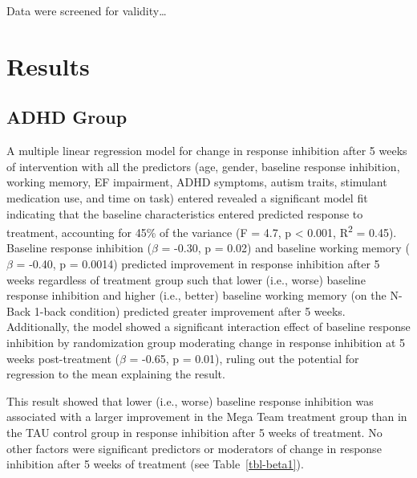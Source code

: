 \documentclass[
  letterpaper,
]{ut-thesis}
\begin{document}
Data were screened for validity\ldots{}


\chapter{Results}\label{results}

\section{ADHD Group}\label{adhd-group}

A multiple linear regression model for change in response inhibition
after 5 weeks of intervention with all the predictors (age, gender,
baseline response inhibition, working memory, EF impairment, ADHD
symptoms, autism traits, stimulant medication use, and time on task)
entered revealed a significant model fit indicating that the baseline
characteristics entered predicted response to treatment, accounting for
45\% of the variance (F = 4.7, p \textless{} 0.001, R\textsuperscript{2}
= 0.45). Baseline response inhibition (\(\beta\) = -0.30, p = 0.02) and
baseline working memory (\(\beta\) = -0.40, p = 0.0014) predicted
improvement in response inhibition after 5 weeks regardless of treatment
group such that lower (i.e., worse) baseline response inhibition and
higher (i.e., better) baseline working memory (on the N-Back 1-back
condition) predicted greater improvement after 5 weeks. Additionally,
the model showed a significant interaction effect of baseline response
inhibition by randomization group moderating change in response
inhibition at 5 weeks post-treatment (\(\beta\) = -0.65, p = 0.01),
ruling out the potential for regression to the mean explaining the
result.

This result showed that lower (i.e., worse) baseline response inhibition
was associated with a larger improvement in the Mega Team treatment
group than in the TAU control group in response inhibition after 5 weeks
of treatment. No other factors were significant predictors or moderators
of change in response inhibition after 5 weeks of treatment (see
Table~\ref{tbl-beta1}).
\end{document}

